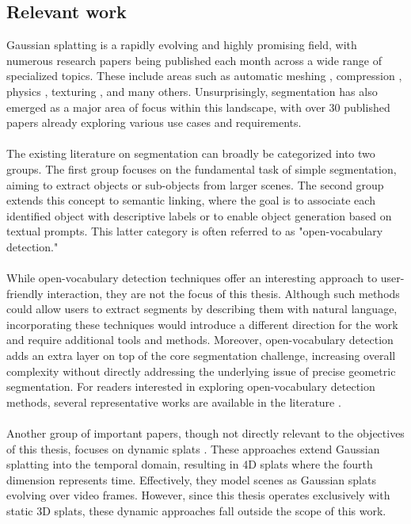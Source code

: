 \documentclass[12pt]{article}
\begin{document}
\subsection{Relevant work}
Gaussian splatting is a rapidly evolving and highly promising field, with numerous research papers being published each month across a wide range of specialized topics. These include areas such as automatic meshing \parencite{automesh}, compression \parencite{compression}, physics \parencite{physics}, texturing \parencite{texture}, and many others. Unsurprisingly, segmentation has also emerged as a major area of focus within this landscape, with over 30 published papers already exploring various use cases and requirements.
\\\\
The existing literature on segmentation can broadly be categorized into two groups. The first group focuses on the fundamental task of simple segmentation, aiming to extract objects or sub-objects from larger scenes. The second group extends this concept to semantic linking, where the goal is to associate each identified object with descriptive labels or to enable object generation based on textual prompts. This latter category is often referred to as "open-vocabulary detection."
\\\\
While open-vocabulary detection techniques offer an interesting approach to user-friendly interaction, they are not the focus of this thesis. Although such methods could allow users to extract segments by describing them with natural language, incorporating these techniques would introduce a different direction for the work and require additional tools and methods. Moreover, open-vocabulary detection adds an extra layer on top of the core segmentation challenge, increasing overall complexity without directly addressing the underlying issue of precise geometric segmentation. For readers interested in exploring open-vocabulary detection methods, several representative works are available in the literature \parencite{vocab1, vocab2, vocab3}.
\\\\
Another group of important papers, though not directly relevant to the objectives of this thesis, focuses on dynamic splats \parencite{dyn1,dyn2}. These approaches extend Gaussian splatting into the temporal domain, resulting in 4D splats where the fourth dimension represents time. Effectively, they model scenes as Gaussian splats evolving over video frames. However, since this thesis operates exclusively with static 3D splats, these dynamic approaches fall outside the scope of this work.
\end{document}
